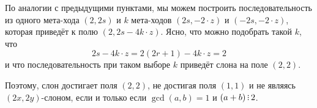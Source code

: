 \begin{enumerate}
По аналогии с предыдущими пунктами, мы можем построить последовательность из
одного мета-хода $(2,2s)$ и $k$ мета-ходов $(2s,-2 \cdot z)$ и $(-2s,-2 \cdot z)$,
которая приведёт к полю $(2,2s-4k\cdot z)$. Ясно, что можно подобрать такой $k$,
что $$2s-4k\cdot z = 2(2r+1)-4k\cdot z = 2$$
и что последовательность при таком выборе $k$ приведёт слона на поле $(2,2)$.

Поэтому, слон достигает поля $(2,2)$, не достигая поля $(1,1)$ и не являясь $(2x,2y)$-слоном,
если и только если $\gcd(a,b)=1$ и $(a+b) \divsby 2$.

\end{enumerate}
